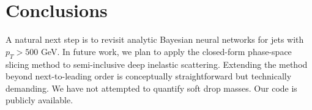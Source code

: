 \section{Conclusions}\label{sec:conclusions}

A natural next step is to revisit analytic Bayesian neural networks for
jets with $p_T > 500$ GeV. In future work, we plan to apply the
closed-form phase-space slicing method to semi-inclusive deep inelastic
scattering. Extending the method beyond next-to-leading order is
conceptually straightforward but technically demanding. We have not
attempted to quantify soft drop masses. Our code is publicly available.

